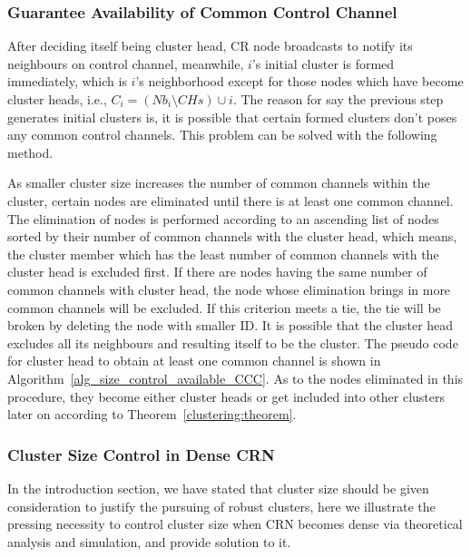 \documentclass[journal,comsoc]{IEEEtran}
\theoremstyle{mytheoremstyle}
\theoremstyle{mytheoremstyle}
\theoremstyle{mytheoremstyle}
\newcommand{\ie}{i.e., }
\begin{document}
\subsubsection{Guarantee Availability of Common Control Channel}
After deciding itself being cluster head, CR node broadcasts to notify its neighbours on control channel, meanwhile, $i$'s initial cluster is formed immediately, which is $i$'s neighborhood except for those nodes which have become cluster heads, \ie $C_i=(Nb_i\setminus CHs)\cup i$.
The reason for say the previous step generates initial clusters is, it is possible that certain formed clusters don't poses any common control channels.
This problem can be solved with the following method. 

As smaller cluster size increases the number of common channels within the cluster, certain nodes are eliminated until there is at least one common channel.
The elimination of nodes is performed according to an ascending list of nodes sorted by their number of common channels with the cluster head, which means, the cluster member which has the least number of common channels with the cluster head is excluded first.
If there are nodes having the same number of common channels with cluster head, the node whose elimination brings in more common channels will be excluded.
If this criterion meets a tie, the tie will be broken by deleting the node with smaller ID.
It is possible that the cluster head excludes all its neighbours and resulting itself to be the cluster.
The pseudo code for cluster head to obtain at least one common channel is shown in Algorithm~\ref{alg_size_control_available_CCC}.
As to the nodes eliminated in this procedure, they become either cluster heads or get included into other clusters later on according to Theorem~\ref{clustering:theorem}.




\subsubsection{Cluster Size Control in Dense CRN}
\label{cluster_pruning}

In the introduction section, we have stated that cluster size should be given consideration to justify the pursuing of robust clusters, here we illustrate the pressing necessity to control cluster size when CRN becomes dense via theoretical analysis and simulation, and provide solution to it.
\end{document}

